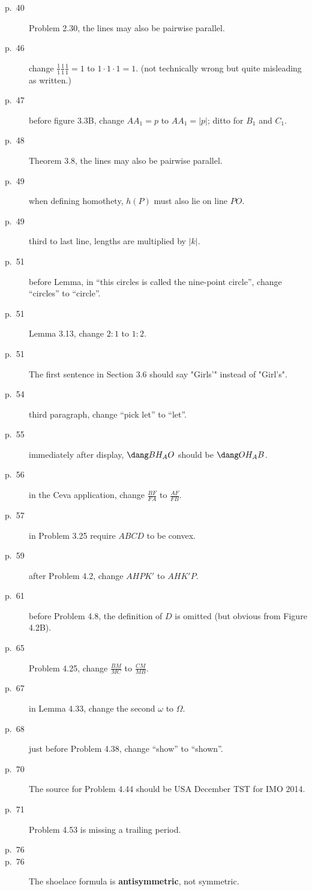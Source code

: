 \documentclass[11pt]{scrartcl}
\begin{document}
\begin{description}
\item[p.\  40] Problem 2.30, the lines may also be pairwise parallel.
\item[p.\  46] change $\frac 11 \frac 11 \frac 11 = 1$ to $1 \cdot 1 \cdot 1 = 1$.
  (not technically wrong but quite misleading as written.)
\item[p.\  47] before figure 3.3B, change $AA_1=p$ to $AA_1=|p|$; ditto for $B_1$ and $C_1$.
\item[p.\  48] Theorem 3.8, the lines may also be pairwise parallel.
\item[p.\  49] when defining homothety, $h(P)$ must also lie on line $PO$.
\item[p.\  49] third to last line, lengths are multiplied by $|k|$.
\item[p.\  51] before Lemma, in ``this circles is called the nine-point circle'',
  change ``circles'' to ``circle''.
\item[p.\  51] Lemma 3.13, change $2:1$ to $1:2$.
\item[p.\  51] The first sentence in Section 3.6 should say "Girls'" instead of "Girl's". 
\item[p.\  54] third paragraph, change ``pick let'' to ``let''.
\item[p.\  55] immediately after display, $\dang BH_AO$ should be $\dang OH_AB$.
\item[p.\  56] in the Ceva application, change $\frac{BF}{FA}$ to $\frac{AF}{FB}$.
\item[p.\  57] in Problem 3.25 require $ABCD$ to be convex.
\item[p.\  59] after Problem 4.2, change $AHPK'$ to $AHK'P$.
\item[p.\  61] before Problem 4.8, the definition of $D$ is omitted (but obvious from Figure 4.2B).
\item[p.\  65] Problem 4.25, change $\frac{BM}{MC}$ to $\frac{CM}{MB}$.
\item[p.\  67] in Lemma 4.33, change the second $\omega$ to $\Omega$.
\item[p.\  68] just before Problem 4.38, change ``show'' to ``shown''.
\item[p.\  70] The source for Problem 4.44 should be USA December TST for IMO 2014.
\item[p.\  71] Problem 4.53 is missing a trailing period.
\item[p.\  76] 
\item[p.\  76] The shoelace formula is \textbf{antisymmetric}, not symmetric.

\end{description}
\end{document}
